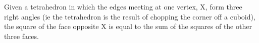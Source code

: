  Given a tetrahedron in which the edges meeting at one vertex, X, 
form three right angles (ie the tetrahedron is the result of 
chopping the corner off a cuboid), the square of the face
opposite X is equal to the sum of the squares of the other three
faces.
